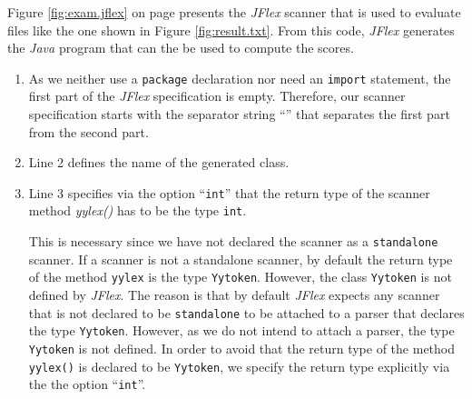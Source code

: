 Figure \ref{fig:exam.jflex} on page \pageref{fig:exam.jflex} presents the \textsl{JFlex} scanner
that is used to evaluate files like the one shown in Figure \ref{fig:result.txt}.  From this code,
\textsl{JFlex} generates the \textsl{Java} program that can the be used to compute the scores.
\begin{enumerate}
\item As we neither use a \texttt{package} declaration nor need an \texttt{import} statement,
      the first part of the \textsl{JFlex} specification is empty.  Therefore, our scanner
      specification starts with the separator string ``\texttt{}''
      that separates the first part from the second part.
\item Line 2 defines the name of the generated class.
\item Line 3 specifies via the option ``\texttt{int}'' that the return type of the scanner
      method \textsl{yylex()} has to be the type  \texttt{int}.

      This is necessary since we have not declared the scanner as a 
      \texttt{standalone} scanner.  If  a scanner is not a standalone scanner, by default the return
      type of the method \texttt{yylex} is the type \texttt{Yytoken}.
      However, the class \texttt{Yytoken} is not defined by \textsl{JFlex}.  The reason is that by default
      \textsl{JFlex} expects any scanner that is not declared to be \texttt{standalone}
      to be attached to a parser that declares the type \texttt{Yytoken}.  However, as we do not
      intend to attach a parser, the type \texttt{Yytoken} is not defined.  In order to avoid
      that the return type of the method \texttt{yylex()} is declared to be \texttt{Yytoken},
      we specify the return type explicitly via the the option ``\texttt{int}''.


\end{enumerate}
